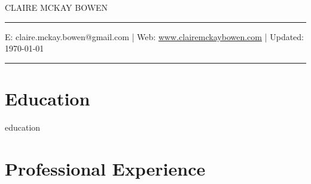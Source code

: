 \documentclass[11pt, letterpaper, roman]{moderncv} %
\begin{document}
\vspace{-10pt}
\centerline{\huge{CLAIRE MCKAY BOWEN}}
\vspace{10pt}
\hrule
\vspace{5pt}
\centerline{\small E: claire.mckay.bowen@gmail.com | Web: \href{https://www.clairemckaybowen.com}{www.clairemckaybowen.com} | Updated: \today}
\vspace{5pt}
\hrule


\section{Education}
{education}

\vspace{-5pt}
\section{Professional Experience}
\end{document}
